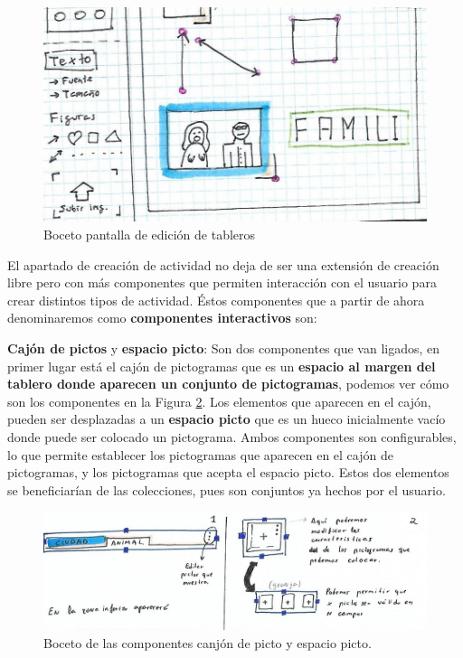 \begin{figure}[h!]
	\centering
	\includegraphics[width=0.7\linewidth]{Imagenes/Bitmap/DibujoLibreAlfon}
	\caption{Boceto pantalla de edición de tableros }
	\label{fig:dibujolibrealfon}
\end{figure}

El apartado de  creación de actividad no deja de ser una extensión de creación libre pero con más  componentes que permiten interacción con el usuario para crear distintos tipos de actividad. Éstos componentes que a partir de ahora denominaremos como \textbf{componentes interactivos} son:


\textbf{Cajón de pictos} y \textbf{espacio picto}: Son dos componentes que van ligados, en primer lugar está el cajón de pictogramas que es un \textbf{espacio al margen del tablero donde aparecen un conjunto de pictogramas}, podemos ver cómo son los componentes en la Figura \ref{fig:componentecajon}. Los elementos que aparecen en el cajón, pueden  ser desplazadas a un \textbf{espacio picto} que es un hueco inicialmente vacío donde puede ser colocado un pictograma. Ambos componentes son configurables, lo que permite establecer los pictogramas que aparecen en el cajón de pictogramas, y los pictogramas que acepta el espacio picto. Estos dos elementos se beneficiarían de las colecciones, pues son conjuntos ya hechos por el usuario.

\begin{figure}[h!]
	\centering
	\includegraphics[width=0.7\linewidth]{Imagenes/Bitmap/componenteCajon}
	\caption{Boceto de las componentes canjón de picto y espacio picto.}
	\label{fig:componentecajon}
\end{figure}




